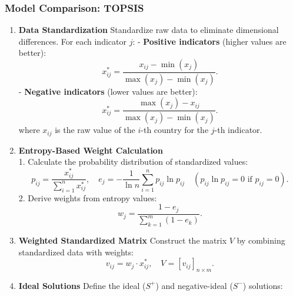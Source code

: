     \subsubsection{Model Comparison: TOPSIS} %
        \begin{enumerate}
            \item \textbf{Data Standardization}
                Standardize raw data to eliminate dimensional differences.
                For each indicator \(j\):
                - \textbf{Positive indicators} (higher values are better):
                \begin{equation}
                    x_{ij}^* = \frac{x_{ij} - \min(x_j)}{\max(x_j) - \min(x_j)}.\label{eq:5-3-4-1}
                \end{equation}
                - \textbf{Negative indicators} (lower values are better):
                \begin{equation}
                    x_{ij}^* = \frac{\max(x_j) - x_{ij}}{\max(x_j) - \min(x_j)}.\label{eq:5-3-4-2}
                \end{equation}
                where \(x_{ij}\) is the raw value of the \(i\)-th country for the \(j\)-th indicator.
            \item \textbf{Entropy-Based Weight Calculation} \\
                1. Calculate the probability distribution of standardized values:
                \begin{equation}
                    p_{ij} = \frac{x_{ij}^*}{\sum_{i=1}^n x_{ij}^*}, \quad e_j = -\frac{1}{\ln n} \sum_{i=1}^n p_{ij} \ln p_{ij} \quad (p_{ij} \ln p_{ij} = 0 \text{ if } p_{ij}=0).\label{eq:5-3-4-3}
                \end{equation}
                2. Derive weights from entropy values:
                \begin{equation}
                    w_j = \frac{1 - e_j}{\sum_{k=1}^m (1 - e_k)}.\label{eq:5-3-4-4}
                \end{equation}
            \item \textbf{Weighted Standardized Matrix}
                Construct the matrix \(V\) by combining standardized data with weights:
                \begin{equation}
                    v_{ij} = w_j \cdot x_{ij}^*, \quad V = [v_{ij}]_{n \times m}.\label{eq:5-3-4-5}
                \end{equation}
            \item \textbf{Ideal Solutions}
                Define the ideal (\(S^+\)) and negative-ideal (\(S^-\)) solutions:

\end{enumerate}
